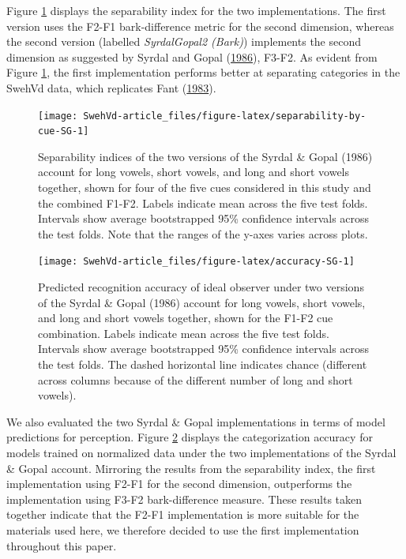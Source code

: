 \documentclass[utf8]{frontiersSCNS}
\begin{document}
Figure \ref{fig:separability-by-cue-SG} displays the separability index for the two implementations. The first version uses the F2-F1 bark-difference metric for the second dimension, whereas the second version (labelled \emph{SyrdalGopal2 (Bark)}) implements the second dimension as suggested by Syrdal and Gopal (\protect\hyperlink{ref-Syrdal1986}{1986}), F3-F2. As evident from Figure \ref{fig:separability-by-cue-SG}, the first implementation performs better at separating categories in the SwehVd data, which replicates Fant (\protect\hyperlink{ref-fant1983}{1983}).

\begin{figure}

{\centering \texttt{[image: SwehVd-article\_files/figure-latex/separability-by-cue-SG-1]} 

}

\caption{Separability indices of the two versions of the Syrdal \& Gopal (1986) account for long vowels, short vowels, and long and short vowels together, shown for four of the five cues considered in this study and the combined F1-F2. Labels indicate mean across the five test folds. Intervals show average bootstrapped 95\% confidence intervals across the test folds. Note that the ranges of the y-axes varies across plots.}\label{fig:separability-by-cue-SG}
\end{figure}



\begin{figure}

{\centering \texttt{[image: SwehVd-article\_files/figure-latex/accuracy-SG-1]} 

}

\caption{Predicted recognition accuracy of ideal observer under two versions of the Syrdal \& Gopal (1986) account for long vowels, short vowels, and long and short vowels together, shown for the F1-F2 cue combination. Labels indicate mean across the five test folds. Intervals show average bootstrapped 95\% confidence intervals across the test folds. The dashed horizontal line indicates chance (different across columns because of the different number of long and short vowels).}\label{fig:accuracy-SG}
\end{figure}

We also evaluated the two Syrdal \& Gopal implementations in terms of model predictions for perception. Figure \ref{fig:accuracy-SG} displays the categorization accuracy for models trained on normalized data under the two implementations of the Syrdal \& Gopal account. Mirroring the results from the separability index, the first implementation using F2-F1 for the second dimension, outperforms the implementation using F3-F2 bark-difference measure. These results taken together indicate that the F2-F1 implementation is more suitable for the materials used here, we therefore decided to use the first implementation throughout this paper.
\end{document}
